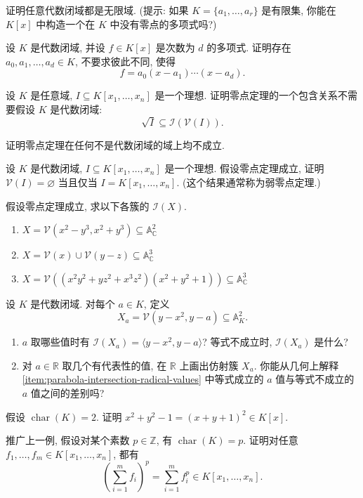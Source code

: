 \BookExerciseHeading
\begin{BookExercises}
  \item\label{ex:algebraically-closed-field-infinite} 证明任意代数闭域都是无限域. (提示: 如果 $K=\{a_{1},\ldots,a_{r}\}$ 是有限集, 你能在 $K[x]$ 中构造一个在 $K$ 中没有零点的多项式吗?)
  \item\label{ex:factorization-over-algebraically-closed-field} 设 $K$ 是代数闭域, 并设 $f\in K[x]$ 是次数为 $d$ 的多项式. 证明存在 $a_{0},a_{1},\ldots,a_{d}\in K$, 不要求彼此不同, 使得
    \[
      f=a_{0}(x-a_{1})\cdots(x-a_{d}).
    \]
  \item\label{ex:radical-contained-in-vanishing-ideal} 设 $K$ 是任意域, $I\subseteq K[x_{1},\ldots,x_{n}]$ 是一个理想. 证明零点定理的一个包含关系不需要假设 $K$ 是代数闭域:
    \[
      \sqrt{I}\subseteq\mathcal{I}(\mathcal{V}(I)).
    \]
  \item\label{ex:nullstellensatz-requires-algebraically-closed-field} 证明零点定理在任何不是代数闭域的域上均不成立.
  \item\label{ex:weak-nullstellensatz} 设 $K$ 是代数闭域, $I\subseteq K[x_{1},\ldots,x_{n}]$ 是一个理想. 假设零点定理成立, 证明 $\mathcal{V}(I)=\varnothing$ 当且仅当 $I=K[x_{1},\ldots,x_{n}]$. (这个结果通常称为弱零点定理.)
  \item\label{ex:compute-ideals-by-nullstellensatz} 假设零点定理成立, 求以下各簇的 $\mathcal{I}(X)$.
    \begin{enumerate}[label=(\alph*)]
      \item $X=\mathcal{V}(x^{2}-y^{3},x^{2}+y^{3})\subseteq\mathbb{A}^{2}_{\mathbb{C}}$
      \item $X=\mathcal{V}(x)\cup\mathcal{V}(y-z)\subseteq\mathbb{A}^{3}_{\mathbb{C}}$
      \item $X=\mathcal{V}((x^{2}y^{2}+yz^{2}+x^{3}z^{2})(x^{2}+y^{2}+1))\subseteq\mathbb{A}^{3}_{\mathbb{C}}$
    \end{enumerate}
  \item\label{ex:parametrized-radical-ideal-parabola-intersection} 设 $K$ 是代数闭域. 对每个 $a\in K$, 定义
    \[
      X_{a}=\mathcal{V}(y-x^{2},y-a)\subseteq\mathbb{A}^{2}_{K}.
    \]
    \begin{enumerate}[label=(\alph*),ref=(\alph*)]
      \item\label{item:parabola-intersection-radical-values} $a$ 取哪些值时有 $\mathcal{I}(X_{a})=\langle y-x^{2},y-a\rangle$? 等式不成立时, $\mathcal{I}(X_{a})$ 是什么?
      \item 对 $a\in\mathbb{R}$ 取几个有代表性的值, 在 $\mathbb{R}$ 上画出仿射簇 $X_{a}$. 你能从几何上解释 \ref{item:parabola-intersection-radical-values} 中等式成立的 $a$ 值与等式不成立的 $a$ 值之间的差别吗?
    \end{enumerate}
  \item\label{ex:unit-circle-characteristic-two} 假设 $\operatorname{char}(K)=2$. 证明 $x^{2}+y^{2}-1=(x+y+1)^{2}\in K[x]$.
  \item\label{ex:frobenius-additivity-for-polynomials} 推广上一例, 假设对某个素数 $p\in\mathbb{Z}$, 有 $\operatorname{char}(K)=p$. 证明对任意 $f_{1},\ldots,f_{m}\in K[x_{1},\ldots,x_{n}]$, 都有
    \[
      \left(\sum_{i=1}^{m}f_{i}\right)^{p}
        =\sum_{i=1}^{m}f_{i}^{p}\in K[x_{1},\ldots,x_{n}].
    \]
\end{BookExercises}
